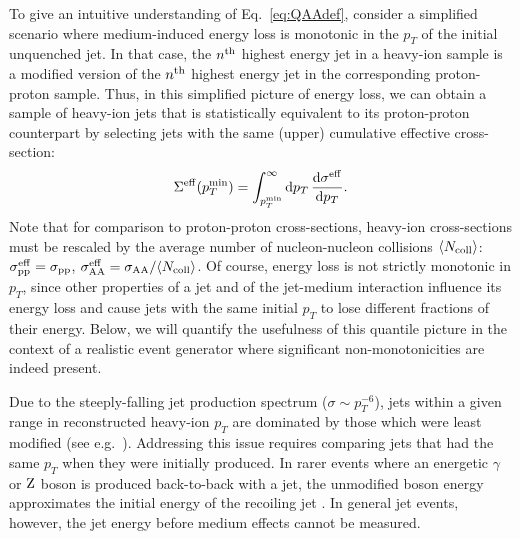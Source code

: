 \documentclass[aps,prl,twocolumn,preprintnumbers,superscriptaddress,showpacs,floatfix, nofootinbib]{revtex4-1}
\newcommand{\Z}{\rm Z}
\newcommand{\Eq}[1]{Eq.~\eqref{#1}}
\newcommand{\df}{\text{d}}
\begin{document}
To give an intuitive understanding of \Eq{eq:QAAdef}, consider a simplified scenario where medium-induced energy loss is monotonic in the $p_T$ of the initial unquenched jet.
%
In that case, the $n^{\rm th}$ highest energy jet in a heavy-ion sample is a modified version of the $n^{\rm th}$ highest energy jet in the corresponding proton-proton sample.
%
Thus, in this simplified picture of energy loss, we can obtain a sample of heavy-ion jets that is statistically equivalent to its proton-proton counterpart by selecting jets with the same (upper) cumulative effective cross-section:
%
\begin{equation}
	\label{eq:cumXSdef}
\Sigma^{\rm eff}(p^{\rm min}_T) = \int_{p^{\rm min}_T}^{\infty} \df p_T \, \frac{\df \sigma^{\rm eff}}{\df p_T}.
\end{equation}
%
Note that for comparison to proton-proton cross-sections, heavy-ion cross-sections must be rescaled by the average number of nucleon-nucleon collisions $\langle N_{\rm coll} \rangle$: $\sigma^{\rm eff}_{\rm pp} = \sigma_{\rm pp}$, $\sigma^{\rm eff}_{\rm AA} = \sigma_{\rm AA}/\langle N_{\rm coll} \rangle$.
%
Of course, energy loss is not strictly monotonic in $p_T$, since other properties of a jet and of the jet-medium interaction influence its energy loss and cause jets with the same initial $p_T$ to lose different fractions of their energy.
%
Below, we will quantify the usefulness of this quantile picture in the context of a realistic event generator where significant non-monotonicities are indeed present.

Due to the steeply-falling jet production spectrum ($\sigma \sim p_T^{-6}$), jets within a given range in reconstructed heavy-ion $p_T$ are dominated by those which were least modified (see e.g.~\cite{Andrews:2018jcm}).
%
Addressing this issue requires comparing jets that had the same $p_T$ when they were initially produced.
%
In rarer events where an energetic $\gamma$ or $\Z$ boson is produced back-to-back with a jet, the unmodified boson energy approximates the initial energy of the recoiling jet \cite{Chatrchyan:2012gt,Sirunyan:2017jic}.
%
In general jet events, however, the jet energy before medium effects cannot be measured.
\end{document}
